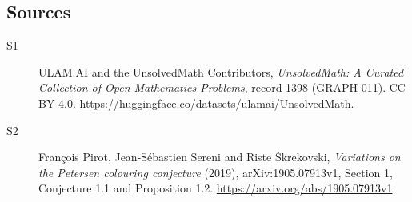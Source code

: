 \documentclass[11pt]{article}
\begin{document}
\subsection{Sources}
\begin{description}
\item[\hypertarget{source:1398:1}{S1}] ULAM.AI and the UnsolvedMath Contributors, \emph{UnsolvedMath: A Curated Collection of Open Mathematics Problems}, record 1398 (GRAPH-011). CC BY 4.0. \url{https://huggingface.co/datasets/ulamai/UnsolvedMath}.
\item[\hypertarget{source:1398:2}{S2}] François Pirot, Jean-Sébastien Sereni and Riste Škrekovski, \emph{Variations on the Petersen colouring conjecture} (2019), arXiv:1905.07913v1, Section 1, Conjecture 1.1 and Proposition 1.2. \url{https://arxiv.org/abs/1905.07913v1}.
\end{description}
\label{end:1398}
\end{document}
